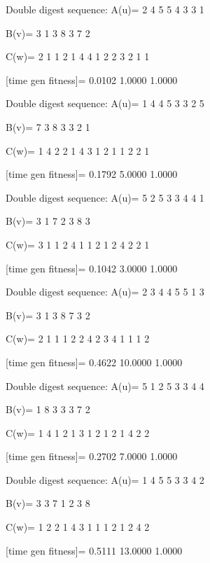 Double digest sequence:
A(u)=
     2     4     5     5     4     3     3     1

B(v)=
     3     1     3     8     3     7     2

C(w)=
     2     1     1     2     1     4     4     1     2     2     3     2     1     1

[time gen fitness]=
    0.0102    1.0000    1.0000

Double digest sequence:
A(u)=
     1     4     4     5     3     3     2     5

B(v)=
     7     3     8     3     3     2     1

C(w)=
     1     4     2     2     1     4     3     1     2     1     1     2     2     1

[time gen fitness]=
    0.1792    5.0000    1.0000

Double digest sequence:
A(u)=
     5     2     5     3     3     4     4     1

B(v)=
     3     1     7     2     3     8     3

C(w)=
     3     1     1     2     4     1     1     2     1     2     4     2     2     1

[time gen fitness]=
    0.1042    3.0000    1.0000

Double digest sequence:
A(u)=
     2     3     4     4     5     5     1     3

B(v)=
     3     1     3     8     7     3     2

C(w)=
     2     1     1     1     2     2     4     2     3     4     1     1     1     2

[time gen fitness]=
    0.4622   10.0000    1.0000

Double digest sequence:
A(u)=
     5     1     2     5     3     3     4     4

B(v)=
     1     8     3     3     3     7     2

C(w)=
     1     4     1     2     1     3     1     2     1     2     1     4     2     2

[time gen fitness]=
    0.2702    7.0000    1.0000

Double digest sequence:
A(u)=
     1     4     5     5     3     3     4     2

B(v)=
     3     3     7     1     2     3     8

C(w)=
     1     2     2     1     4     3     1     1     1     2     1     2     4     2

[time gen fitness]=
    0.5111   13.0000    1.0000


